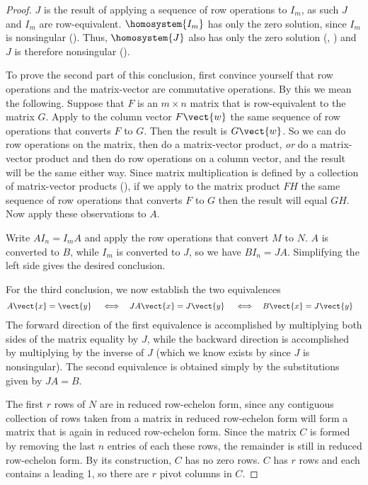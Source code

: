 \begin{proof}
$J$ is the result of applying a sequence of row operations to $I_m$, as such $J$ and $I_m$ are row-equivalent.  $\homosystem{I_m}$ has only the zero solution, since $I_m$ is nonsingular ().  Thus, $\homosystem{J}$ also has only the zero solution (, ) and $J$ is therefore nonsingular ().\par
%
To prove the second part of this conclusion, first convince yourself that row operations and the matrix-vector are commutative operations.  By this we mean the following.
Suppose that $F$ is an $m\times n$ matrix that is row-equivalent to the matrix $G$.  Apply to the column vector $F\vect{w}$ the same sequence of row operations that converts $F$ to $G$.  Then the result is $G\vect{w}$.  So we can do row operations on the matrix, then do a matrix-vector product, {\em or} do a matrix-vector product and then do row operations on a column vector, and the result will be the same either way.  Since matrix multiplication is defined by a collection of matrix-vector products (), if we apply to the matrix product $FH$ the same sequence of row operations that converts $F$ to $G$ then the result will equal $GH$.  Now apply these observations to $A$.\par
%
Write $AI_n=I_mA$ and apply the row operations that convert $M$ to $N$.  $A$ is converted to $B$, while $I_m$ is converted to $J$, so we have $BI_n=JA$.  Simplifying the left side gives the desired conclusion.\par
%
For the third conclusion, we now establish the two equivalences
%
\begin{align*}
A\vect{x}&=\vect{y} &
&\iff &
JA\vect{x}&=J\vect{y} &
&\iff &
B\vect{x}&=J\vect{y}
\end{align*}
%
The forward direction of the first equivalence is accomplished by multiplying both sides of the matrix equality by $J$, while the backward direction is accomplished by multiplying by the inverse of $J$ (which we know exists by  since $J$ is nonsingular).  The second equivalence is obtained simply by the substitutions given by $JA=B$.\par
%
The first $r$ rows of $N$ are in reduced row-echelon form, since any contiguous collection of rows taken from a matrix in reduced row-echelon form will form a matrix that is again in reduced row-echelon form.   Since the matrix $C$ is formed by removing the last $n$ entries of each these rows, the remainder is still in reduced row-echelon form.  By its construction, $C$ has no zero rows. $C$ has $r$ rows and each contains a leading 1, so there are $r$ pivot columns in $C$.\par

\end{proof}
